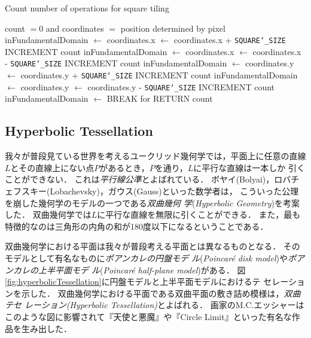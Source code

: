 \begin{algorithm}
 \begin{algorithmic}
  \caption{Count number of operations for square tiling}
  \label{alg:rectTile}
  \REQUIRE count $= 0$ and coordinates $=$ position determined by pixel
  \STATE inFundamentalDomain $\leftarrow$ \TRUE
  \STATE coordinates.x $\leftarrow$ coordinates.x + \texttt{SQUARE\char`_SIZE}
  \STATE INCREMENT count
  \STATE inFundamentalDomain $\leftarrow$ \FALSE
  \ENDIF
  \STATE coordinates.x $\leftarrow$ coordinates.x - \texttt{SQUARE\char`_SIZE}
  \STATE INCREMENT count
  \STATE inFundamentalDomain $\leftarrow$ \FALSE
  \ENDIF
  \STATE coordinates.y $\leftarrow$ coordinates.y + \texttt{SQUARE\char`_SIZE}
  \STATE INCREMENT count
  \STATE inFundamentalDomain $\leftarrow$ \FALSE
  \ENDIF
  \STATE coordinates.y $\leftarrow$ coordinates.y - \texttt{SQUARE\char`_SIZE}
  \STATE INCREMENT count
  \STATE inFundamentalDomain $\leftarrow$ \FALSE
  \ENDIF
  \STATE BREAK for
  \ENDIF
  \ENDFOR
  \STATE RETURN count
 \end{algorithmic}
\end{algorithm}

\subsection{Hyperbolic Tessellation}

我々が普段見ている世界を考えるユークリッド幾何学では，平面上に任意の直線
$L$とその直線上にない点$P$があるとき，$P$を通り，$L$に平行な直線は一本しか
引くことができない．
これは\emph{平行線公準}とよばれている．
ボヤイ(Bolyai)，ロバチェフスキー(Lobachevsky)，ガウス(Gauss)といった数学者は，
こういった公理を崩した幾何学のモデルの一つである\emph{双曲幾何
学}(\textit{Hyperbolic Geometry})を考案した．
双曲幾何学では$L$に平行な直線を無限に引くことができる．
また，最も特徴的なのは三角形の内角の和が180度以下になるということである．

双曲幾何学における平面は我々が普段考える平面とは異なるものとなる．
そのモデルとして有名なものに\emph{ポアンカレの円盤モデ
ル}(\textit{Poincar\'e disk model})や\emph{ポアンカレの上半平面モデ
ル}(\textit{Poincar\'e half-plane model})がある．
図\ref{fig:hyperbolicTessellation}に円盤モデルと上半平面モデルにおけるテ
セレーションを示した．
双曲幾何学における平面である双曲平面の敷き詰め模様は，\emph{双曲テセ
レーション}{\it (Hyperbolic Tessellation)}とよばれる．
画家のM.C.エッシャーはこのような図に影響されて『天使と悪魔』や『Circle
Limit』といった有名な作品を生み出した．


